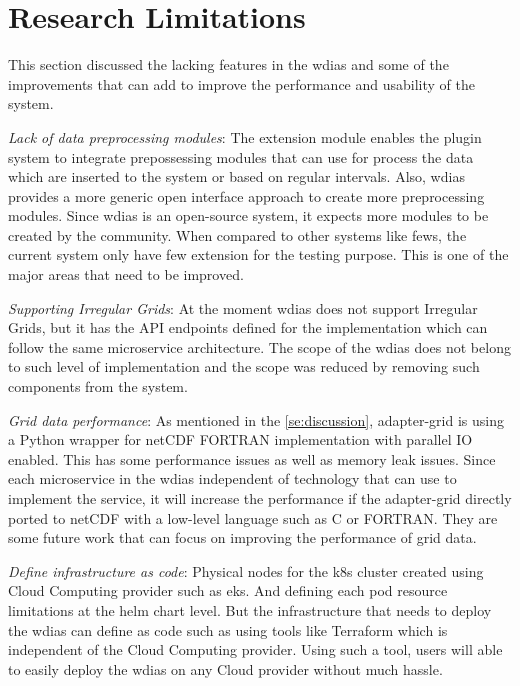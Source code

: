 \section{Research Limitations}
\label{se:research_limitations}

This section discussed the lacking features in the \acrshort{wdias} and some of the improvements that can add to improve the performance and usability of the system.

\emph{Lack of data preprocessing modules}:
The extension module enables the plugin system to integrate prepossessing modules that can use for process the data which are inserted to the system or based on regular intervals. Also, \acrshort{wdias} provides a more generic open interface approach to create more preprocessing modules. Since \acrshort{wdias} is an open-source system, it expects more modules to be created by the community. When compared to other systems like \acrshort{fews}, the current system only have few extension for the testing purpose. This is one of the major areas that need to be improved.

\emph{Supporting Irregular Grids}:
At the moment \acrshort{wdias} does not support Irregular Grids, but it has the API endpoints defined for the implementation which can follow the same microservice architecture. The scope of the \acrshort{wdias} does not belong to such level of implementation and the scope was reduced by removing such components from the system.

\emph{Grid data performance}:
As mentioned in the \cref{se:discussion}, adapter-grid is using a Python wrapper for netCDF FORTRAN implementation with parallel IO enabled. This has some performance issues as well as memory leak issues. Since each microservice in the \acrshort{wdias} independent of technology that can use to implement the service, it will increase the performance if the adapter-grid directly ported to netCDF with a low-level language such as C or FORTRAN. They are some future work that can focus on improving the performance of grid data.

\emph{Define infrastructure as code}:
Physical nodes for the \acrshort{k8s} cluster created using Cloud Computing provider such as \acrshort{eks}. And defining each pod resource limitations at the helm chart level. But the infrastructure that needs to deploy the \acrshort{wdias} can define as code such as using tools like Terraform which is independent of the Cloud Computing provider. Using such a tool, users will able to easily deploy the \acrshort{wdias} on any Cloud provider without much hassle.

